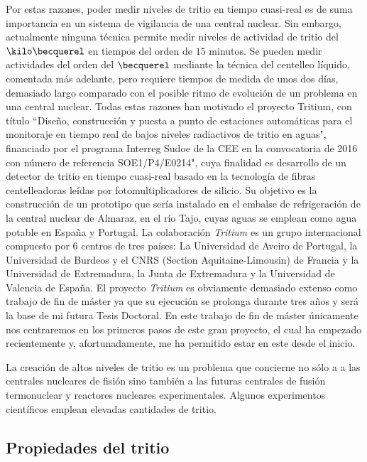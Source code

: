 Por estas razones, poder medir niveles de tritio en tiempo cuasi-real es de suma importancia en un sistema de vigilancia de una central nuclear. Sin embargo, actualmente ninguna técnica permite medir niveles de actividad de tritio del $\kilo\becquerel$ en tiempos del orden de $15$ minutos.   Se pueden medir actividades  del orden del $\becquerel$  mediante la técnica del centelleo líquido, comentada más adelante, pero requiere tiempos de medida de unos dos días, demasiado largo comparado con el posible ritmo de evolución de un problema en una central nuclear.   Todas estas razones han motivado el proyecto Tritium, con título ``Diseño, construcción y puesta a punto de estaciones automáticas para el monitoraje en tiempo real de bajos niveles radiactivos de tritio en aguas",  financiado por el programa Interreg Sudoe de la CEE en la convocatoria de 2016 con número de referencia  SOE1/P4/E0214", cuya finalidad es desarrollo de un detector de tritio en tiempo cuasi-real basado en la tecnología de fibras centelleadoras leídas por fotomultiplicadores de silicio. Su objetivo es la construcción de un prototipo que sería instalado en el embalse de refrigeración de la central nuclear de Almaraz, en el río Tajo, cuyas aguas se emplean como agua potable en España y Portugal.
La colaboración \textit{Tritium} es un grupo internacional compuesto por 6 centros de tres países:  La Universidad de Aveiro de Portugal,  la Universidad de Burdeos y el CNRS (Section Aquitaine-Limousin)  de Francia y  la Universidad de Extremadura, la Junta de Extremadura y la Universidad de Valencia de España. El proyecto \textit{Tritium} es  obviamente demasiado extenso como trabajo de fin de máster ya que  su ejecución se prolonga durante tres  años  y será la base de mi futura Tesis Doctoral. En este trabajo de fin de máster únicamente nos centraremos en los primeros pasos de este gran proyecto, el cual ha empezado recientemente y, afortunadamente, me ha permitido estar en este desde el inicio.









La creación de altos niveles de tritio es un problema que concierne no sólo a  a las  centrales nucleares de fisión sino también a las  futuras centrales de fusión termonuclear y reactores nucleares experimentales. Algunos experimentos científicos emplean elevadas cantidades de tritio.

\subsection{Propiedades del tritio}

